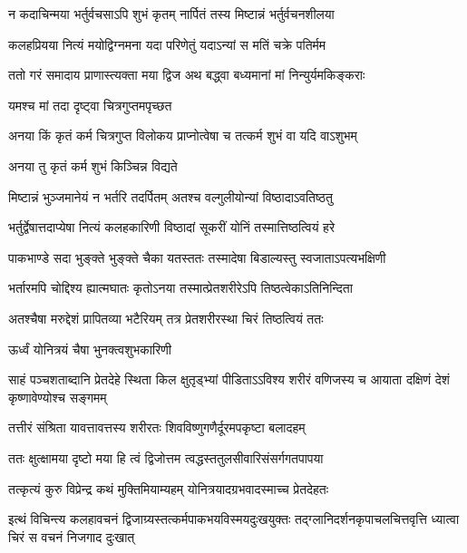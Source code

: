 \twolineshloka
{न कदाचिन्मया भर्तुर्वचसाऽपि शुभं कृतम्}
{नार्पितं तस्य मिष्टान्नं भर्तुर्वचनशीलया} %

\twolineshloka
{कलहप्रियया नित्यं मयोद्विग्नमना यदा}
{परिणेतुं यदाऽन्यां स मतिं चक्रे पतिर्मम} %

\twolineshloka
{ततो गरं समादाय प्राणास्त्यक्ता मया द्विज}
{अथ बद्ध्वा बध्यमानां मां निन्युर्यमकिङ्कराः} %


\onelineshloka
{यमश्च मां तदा दृष्ट्वा चित्रगुप्तमपृच्छत} %


\twolineshloka
{अनया किं कृतं कर्म चित्रगुप्त विलोकय}
{प्राप्नोत्वेषा च तत्कर्म शुभं वा यदि वाऽशुभम्} %





\onelineshloka
{अनया तु कृतं कर्म शुभं किञ्चिन्न विद्यते} %

\twolineshloka
{मिष्टान्नं भुञ्जमानेयं न भर्तरि तदर्पितम्}
{अतश्च वल्गुलीयोन्यां विष्ठादाऽवतिष्ठतु} %

\twolineshloka
{भर्तुर्द्वेषात्तदाप्येषा नित्यं कलहकारिणी}
{विष्ठादां सूकरीं योनिं तस्मात्तिष्ठत्वियं हरे} %

\twolineshloka
{पाकभाण्डे सदा भुङ्क्ते भुङ्क्ते चैका यतस्ततः}
{तस्मादेषा बिडाल्यस्तु स्वजाताऽपत्यभक्षिणी} %

\twolineshloka
{भर्तारमपि चोद्दिश्य ह्यात्मघातः कृतोऽनया}
{तस्मात्प्रेतशरीरेऽपि तिष्ठत्वेकाऽतिनिन्दिता} %

\twolineshloka
{अतश्चैषा मरुद्देशं प्रापितव्या भटैरियम्}
{तत्र प्रेतशरीरस्था चिरं तिष्ठत्वियं ततः} %


\onelineshloka
{ऊर्ध्वं योनित्रयं चैषा भुनक्त्वशुभकारिणी} %


\threelineshloka
{साहं पञ्चशताब्दानि प्रेतदेहे स्थिता किल}
{क्षुतृड्भ्यां पीडिताऽऽविश्य शरीरं वणिजस्य च}
{आयाता दक्षिणं देशं कृष्णावेण्योश्च सङ्गमम्} %

\twolineshloka
{तत्तीरं संश्रिता यावत्तावत्तस्य शरीरतः}
{शिवविष्णुगणैर्दूरमपकृष्टा बलादहम्} %

\twolineshloka
{ततः क्षुत्क्षामया दृष्टो मया हि त्वं द्विजोत्तम}
{त्वद्धस्ततुलसीवारिसंसर्गगतपापया} %

\twolineshloka
{तत्कृत्यं कुरु विप्रेन्द्र कथं मुक्तिमियाम्यहम्}
{योनित्रयादग्रभवादस्माच्च प्रेतदेहतः} %

\twolineshloka
{इत्थं विचिन्त्य कलहावचनं द्विजाग्र्यस्तत्कर्मपाकभयविस्मयदुःखयुक्तः}
{तद्ग्लानिदर्शनकृपाचलचित्तवृत्ति ध्यात्वा चिरं स वचनं निजगाद दुःखात्} %


